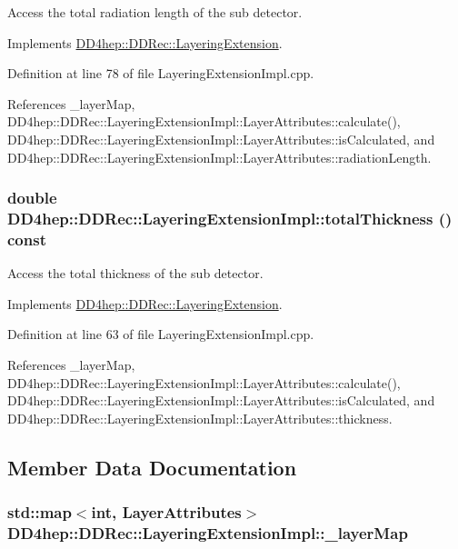 Access the total radiation length of the sub detector. 

Implements \hyperlink{class_d_d4hep_1_1_d_d_rec_1_1_layering_extension_a710dca345926458ed3ab3abc06490ee9}{DD4hep::DDRec::LayeringExtension}.

Definition at line 78 of file LayeringExtensionImpl.cpp.

References \_\-layerMap, DD4hep::DDRec::LayeringExtensionImpl::LayerAttributes::calculate(), DD4hep::DDRec::LayeringExtensionImpl::LayerAttributes::isCalculated, and DD4hep::DDRec::LayeringExtensionImpl::LayerAttributes::radiationLength.\hypertarget{class_d_d4hep_1_1_d_d_rec_1_1_layering_extension_impl_ae245b5a3f6ff14a5c6ab521219695a87}{
\subsubsection[{totalThickness}]{\setlength{\rightskip}{0pt plus 5cm}double DD4hep::DDRec::LayeringExtensionImpl::totalThickness () const}}
\label{class_d_d4hep_1_1_d_d_rec_1_1_layering_extension_impl_ae245b5a3f6ff14a5c6ab521219695a87}


Access the total thickness of the sub detector. 

Implements \hyperlink{class_d_d4hep_1_1_d_d_rec_1_1_layering_extension_a287dd58b108f5d121bc55c91009454ed}{DD4hep::DDRec::LayeringExtension}.

Definition at line 63 of file LayeringExtensionImpl.cpp.

References \_\-layerMap, DD4hep::DDRec::LayeringExtensionImpl::LayerAttributes::calculate(), DD4hep::DDRec::LayeringExtensionImpl::LayerAttributes::isCalculated, and DD4hep::DDRec::LayeringExtensionImpl::LayerAttributes::thickness.

\subsection{Member Data Documentation}
\hypertarget{class_d_d4hep_1_1_d_d_rec_1_1_layering_extension_impl_a59400bb78b40886a131cb8b085df125b}{
\subsubsection[{\_\-layerMap}]{\setlength{\rightskip}{0pt plus 5cm}std::map$<$int, {\bf LayerAttributes}$>$ {\bf DD4hep::DDRec::LayeringExtensionImpl::\_\-layerMap}}}
\label{class_d_d4hep_1_1_d_d_rec_1_1_layering_extension_impl_a59400bb78b40886a131cb8b085df125b}


